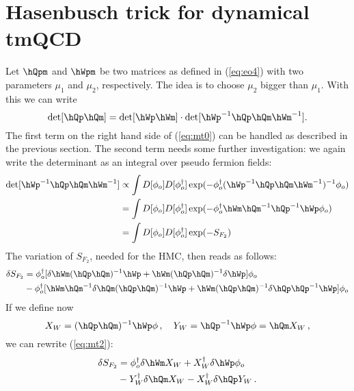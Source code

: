 \section{Hasenbusch trick for dynamical tmQCD}

Let $\hQpm$ and $\hWpm$ be two matrices as defined in (\ref{eq:eo4})
with two parameters $\mu_1$ and $\mu_2$, respectively. The idea is to
choose $\mu_2$ bigger than $\mu_1$. With this we can
write
\begin{equation}
  \label{eq:mt0}
  \det[\hQp\hQm] = \det[\hWp\hWm]\cdot\det[\hWp^{-1}\hQp\hQm\hWm^{-1}].
\end{equation}
The first term on the right hand side of (\ref{eq:mt0}) can be handled
as described in the previous section. The second term needs some
further investigation: we again write the determinant as an integral
over pseudo fermion fields:
\begin{equation}
  \label{eq:mt1}
  \begin{split}
    \det[\hWp^{-1}\hQp\hQm\hWm^{-1}]  &\propto \int
    D[\phi_o]D[\phi_o^\dagger]\exp(-\phi_o^\dagger (\hWp^{-1}\hQp\hQm\hWm^{-1})^{-1}
    \phi_o) \\
    &= \int D[\phi_o]D[\phi_o^\dagger]\exp(-\phi_o^\dagger \hWm\hQm^{-1}\hQp^{-1}\hWp\phi_o) \\
    &= \int D[\phi_o]D[\phi_o^\dagger]\exp(-S_{F_2})
  \end{split}
\end{equation}
The variation of $S_{F_2}$, needed for the HMC, then reads as follows:
\begin{equation}
  \label{eq:mt2}
  \begin{split}
    \delta S_{F_2} &= \phi_o^\dagger[\delta\hWm(\hQp\hQm)^{-1}\hWp
    +\hWm(\hQp\hQm)^{-1}\delta\hWp]\phi_o\\
    &-\phi_o^\dagger[\hWm\hQm^{-1}\delta\hQm(\hQp\hQm)^{-1}\hWp +
    \hWm(\hQp\hQm)^{-1}\delta\hQp\hQp^{-1}\hWp]\phi_o
  \end{split}
\end{equation}
If we define now
\begin{equation}
  \label{eq:mt3}
  X_W = (\hQp\hQm)^{-1}\hWp\phi\, ,\quad Y_W = \hQp^{-1}\hWp\phi = \hQm
  X_W\, ,
\end{equation}
we can rewrite (\ref{eq:mt2}):
\begin{equation}
  \label{eq:mt4}
  \begin{split}
    \delta S_{F_2} &= \phi_o^\dagger\delta\hWm X_W + X_W^\dagger\delta\hWp\phi_o\\
    &-Y_W^\dagger\delta\hQm X_W - X_W^\dagger\delta\hQp Y_W\, .
  \end{split}
\end{equation}
